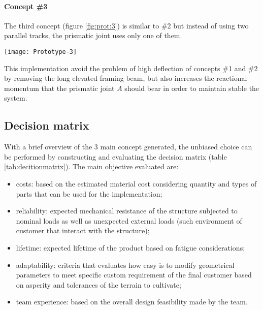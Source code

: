 	\paragraph{Concept \#3}	The third concept (figure \ref{fig:prot:3}) is similar to \#2 but instead of using two parallel tracks, the prismatic joint uses only one of them.

	\begin{SCfigure}[1.5][bht]
		\centering \texttt{[image: Prototype-3]}
		\caption{concept \#3  realised with a combination of both prismatic and revolute joint.}
		\label{fig:prot:3}
	\end{SCfigure}

	This implementation avoid the problem of high deflection of concepts \#1 and \#2 by removing the long elevated framing beam, but also increases the reactional momentum that the prismatic joint $A$ should bear in order to maintain stable the system.
	
	
\subsection{Decision matrix}
	With a brief overview of the 3 main concept generated, the unbiased choice can be performed by constructing and evaluating the decision matrix (table \ref{tab:decitionmatrix}). The main objective evaluated are:
	
	
	
	\begin{itemize}
		\item costs: based on the estimated material cost considering quantity and types of parts that can be used for the implementation;
		\item reliability: expected mechanical  resistance of the structure subjected to nominal loads as well as unexpected external loads (such environment of customer that interact with the structure);
		
		\item lifetime: expected lifetime of the product based on fatigue considerations;
		
		\item adaptability: criteria that evaluates how easy is to modify geometrical parameters to meet specific custom requirement of the final customer based on asperity and tolerances of the terrain to cultivate;
		
		\item team experience: based on the overall design feasibility made by the team.
	\end{itemize}

